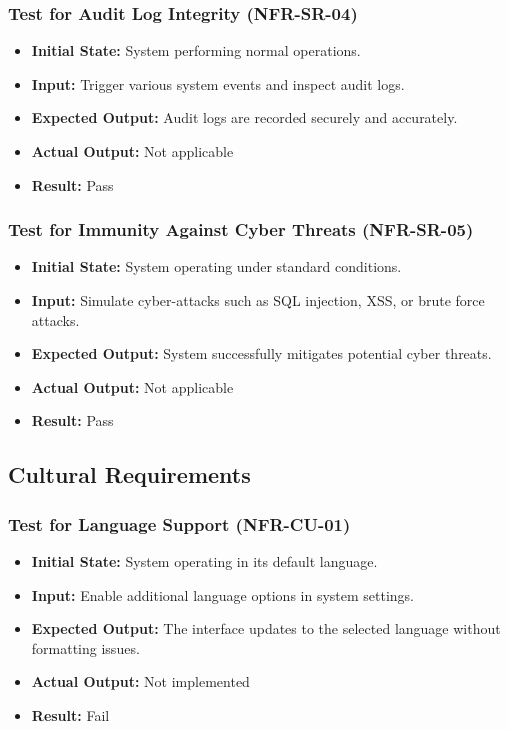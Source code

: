 \documentclass[12pt, titlepage]{article}
\begin{document}
\subsubsection{Test for Audit Log Integrity (NFR-SR-04)}
\begin{itemize}
    \item \textbf{Initial State: }System performing normal operations.
    \item \textbf{Input: }Trigger various system events and inspect audit logs.
    \item \textbf{Expected Output: }Audit logs are recorded securely and accurately.
    \item \textbf{Actual Output: }Not applicable
    \item \textbf{Result: }Pass
\end{itemize}

\subsubsection{Test for Immunity Against Cyber Threats (NFR-SR-05)}
\begin{itemize}
    \item \textbf{Initial State: }System operating under standard conditions.
    \item \textbf{Input: }Simulate cyber-attacks such as SQL injection, XSS, or brute force attacks.
    \item \textbf{Expected Output: }System successfully mitigates potential cyber threats.
    \item \textbf{Actual Output: }Not applicable
    \item \textbf{Result: }Pass
\end{itemize}

\subsection{Cultural Requirements}

\subsubsection{Test for Language Support (NFR-CU-01)}
\begin{itemize}
    \item \textbf{Initial State: }System operating in its default language.
    \item \textbf{Input: }Enable additional language options in system settings.
    \item \textbf{Expected Output: }The interface updates to the selected language without formatting issues.
    \item \textbf{Actual Output: }Not implemented
    \item \textbf{Result: }Fail
\end{itemize}
\end{document}
